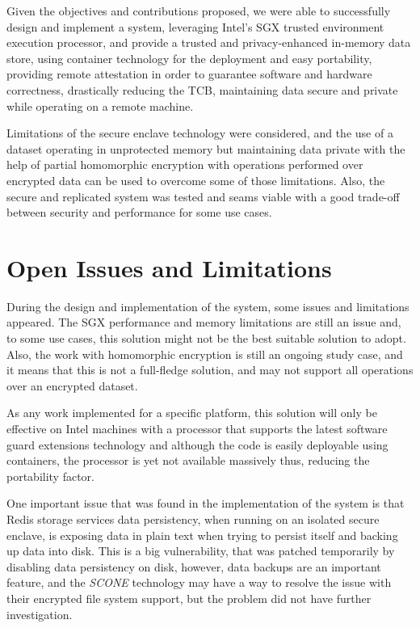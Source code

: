 Given the objectives and contributions proposed, we were able to successfully design and implement a system, leveraging Intel's \gls{SGX} trusted environment execution processor, and provide a trusted and privacy-enhanced in-memory data store, using container technology for the deployment and easy portability, providing remote attestation in order to guarantee software and hardware correctness, drastically reducing the \gls{TCB}, maintaining data secure and private while operating on a remote machine.

Limitations of the secure enclave technology were considered, and the use of a dataset operating in unprotected memory but maintaining data private with the help of partial homomorphic encryption with operations performed over encrypted data can be used to overcome some of those limitations. Also, the secure and replicated system was tested and seams viable with a good trade-off between security and performance for some use cases.

\section{Open Issues and Limitations}
\label{sec:open_issues_and_limitations}

During the design and implementation of the system, some issues and limitations appeared. The \gls{SGX} performance and memory limitations are still an issue and, to some use cases, this solution might not be the best suitable solution to adopt. Also, the work with homomorphic encryption is still an ongoing study case, and it means that this is not a full-fledge solution, and may not support all operations over an encrypted dataset.

As any work implemented for a specific platform, this solution will only be effective on Intel machines with a processor that supports the latest software guard extensions technology and although the code is easily deployable using containers, the processor is yet not available massively thus, reducing the portability factor. 

One important issue that was found in the implementation of the system is that Redis storage services data persistency, when running on an isolated secure enclave, is exposing data in plain text when trying to persist itself and backing up data into disk. This is a big vulnerability, that was patched temporarily by disabling data persistency on disk, however, data backups are an important feature, and the \textit{SCONE} technology may have a way to resolve the issue with their encrypted file system support, but the problem did not have further investigation.

